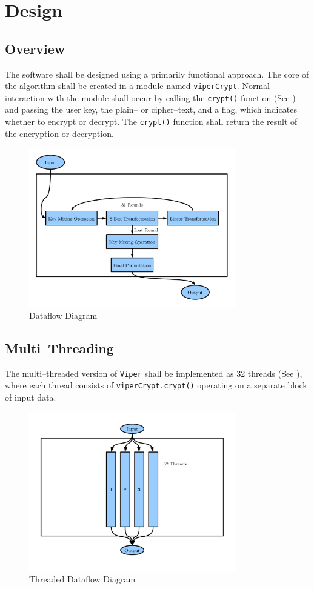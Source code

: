 
\section{Design}

\subsection{Overview}

The software shall be designed using a primarily functional approach. The core of the algorithm shall be created in a module named \texttt{viperCrypt}. Normal interaction with the module shall occur by calling the \texttt{crypt()} function (See ) and passing the user key, the plain-- or cipher--text, and a flag, which indicates whether to encrypt or decrypt. The \texttt{crypt()} function shall return the result of the encryption or decryption.

\begin{figure}[H]
\centering
\includegraphics[width=0.8\textwidth]{Design-Overview-Cipher.pdf}
\caption{Dataflow Diagram}
\label{cryptOverview}
\end{figure}

\subsection{Multi--Threading}

The multi--threaded version of \texttt{Viper} shall be implemented as 32 threads (See ), where each thread consists of \texttt{viperCrypt.crypt()} operating on a separate block of input data.

\begin{figure}[H]
\centering
\includegraphics[width=0.8\textwidth]{Design-Overview-Threaded.pdf}
\caption{Threaded Dataflow Diagram}
\label{threadedOverview}
\end{figure}
